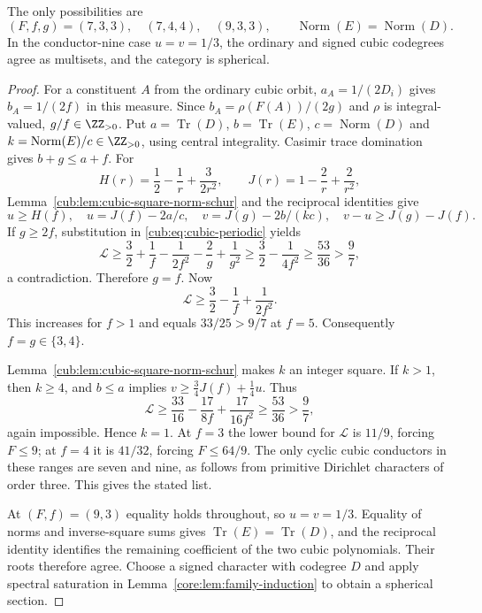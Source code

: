 \begin{theorem}\label{cub:thm:cubic-reduction}
The only possibilities are
\[
 (F,f,g)=(7,3,3),\quad(7,4,4),\quad(9,3,3),
 \qquad \operatorname{Norm}(E)=\operatorname{Norm}(D).
\]
In the conductor-nine case $u=v=1/3$, the ordinary and signed cubic
codegrees agree as multisets, and the category is spherical.
\end{theorem}
\begin{proof}
For a constituent $A$ from the ordinary cubic orbit,
$a_A=1/(2D_i)$ gives $b_A=1/(2f)$ in this measure.
Since $b_A=\rho(F(A))/(2g)$ and $\rho$ is integral-valued,
$g/f\in\ZZ_{>0}$.
Put $a=\operatorname{Tr}(D)$, $b=\operatorname{Tr}(E)$,
$c=\operatorname{Norm}(D)$ and
$k=\operatorname{Norm}(E)/c\in\ZZ_{>0}$, using central
integrality. Casimir trace domination gives $b+g\le a+f$.
For
\[
 H(r)=\frac12-\frac1r+\frac{3}{2r^2},\qquad
 J(r)=1-\frac2r+\frac2{r^2},
\]
Lemma~\ref{cub:lem:cubic-square-norm-schur} and the reciprocal
identities give
\[
 u\ge H(f),\quad u=J(f)-2a/c,\quad v=J(g)-2b/(kc),
 \quad v-u\ge J(g)-J(f).
\]
If $g\ge2f$, substitution in \eqref{cub:eq:cubic-periodic} yields
\[
 \mathcal L\ge\frac32+\frac1f-\frac1{2f^2}-\frac2g+\frac1{g^2}
 \ge\frac32-\frac1{4f^2}\ge\frac{53}{36}>\frac97,
\]
a contradiction. Therefore $g=f$. Now
\[
 \mathcal L\ge\frac32-\frac1f+\frac1{2f^2}.
\]
This increases for $f>1$ and equals $33/25>9/7$ at $f=5$.
Consequently $f=g\in\{3,4\}$.

Lemma~\ref{cub:lem:cubic-square-norm-schur} makes $k$ an integer
square. If $k>1$, then $k\ge4$, and $b\le a$ implies
$v\ge\tfrac34J(f)+\tfrac14u$. Thus
\[
 \mathcal L\ge\frac{33}{16}-\frac{17}{8f}+\frac{17}{16f^2}
 \ge\frac{53}{36}>\frac97,
\]
again impossible. Hence $k=1$.
At $f=3$ the lower bound for $\mathcal L$ is $11/9$, forcing
$F\le9$; at $f=4$ it is $41/32$, forcing $F\le64/9$.
The only cyclic cubic conductors in these ranges are seven and nine,
as follows from primitive Dirichlet characters of order three.
This gives the stated list.

At $(F,f)=(9,3)$ equality holds throughout, so $u=v=1/3$.
Equality of norms and inverse-square sums gives
$\operatorname{Tr}(E)=\operatorname{Tr}(D)$, and the reciprocal
identity identifies the remaining coefficient of the two cubic
polynomials. Their roots therefore agree. Choose a signed character
with codegree $D$ and apply spectral saturation in
Lemma~\ref{core:lem:family-induction} to obtain a spherical section.
\end{proof}

